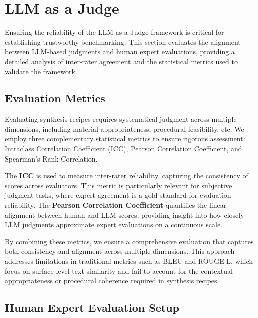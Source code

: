 \section{LLM as a Judge}
\label{sec:reliability}

Ensuring the reliability of the LLM-as-a-Judge framework is critical for establishing trustworthy benchmarking. This section evaluates the alignment between LLM-based judgments and human expert evaluations, providing a detailed analysis of inter-rater agreement and the statistical metrics used to validate the framework.

\subsection{Evaluation Metrics}
\label{subsec:evaluation_metrics}


Evaluating synthesis recipes requires systematical judgment across multiple dimensions, including material appropriateness, procedural feasibility, etc. We employ three complementary statistical metrics to ensure rigorous assessment: Intraclass Correlation Coefficient (ICC), Pearson Correlation Coefficient, and Spearman’s Rank Correlation.

The \textbf{ICC} is used to measure inter-rater reliability, capturing the consistency of scores across evaluators. This metric is particularly relevant for subjective judgment tasks, where expert agreement is a gold standard for evaluation reliability. The \textbf{Pearson Correlation Coefficient} quantifies the linear alignment between human and LLM scores, providing insight into how closely LLM judgments approximate expert evaluations on a continuous scale. 

By combining these metrics, we ensure a comprehensive evaluation that captures both consistency and alignment across multiple dimensions. This approach addresses limitations in traditional metrics such as BLEU and ROUGE-L, which focus on surface-level text similarity and fail to account for the contextual appropriateness or procedural coherence required in synthesis recipes.

\subsection{Human Expert Evaluation Setup}
\label{subsec:humaneval_setup}

